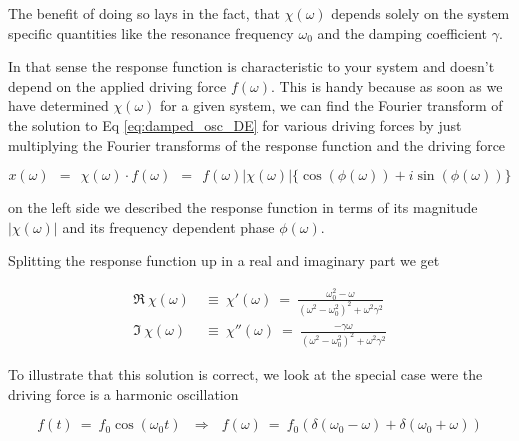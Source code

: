 \documentclass[10pt]{report}
\numberwithin{equation}{chapter}
\newcommand{\refEq}[1]{
  Eq  \ref{#1}
}
\begin{document}
The benefit of doing so lays in the fact, that $\chi(\omega)$ depends solely on the system specific 	quantities like the resonance frequency $\omega_0$ and the damping coefficient $\gamma$.

In that sense the response function is characteristic to your system and doesn't depend on the applied driving force $f(\omega)$. This is handy because as soon as we have determined $\chi(\omega)$ for a given system, we can find the Fourier transform of the solution to \refEq{eq:damped_osc_DE} for various driving forces by just multiplying the Fourier transforms of the response function and the driving force 

\begin{equation}
  x(\omega) ~~=~~ \chi(\omega) \cdot f(\omega) 
  ~~=~~ f(\omega) |\chi(\omega)| \{\cos(\phi(\omega)) +i \sin(\phi(\omega))\}
\end{equation}

on the left side we described the response function in terms of its magnitude $|\chi(\omega)|$ and its frequency dependent phase $\phi(\omega)$.



Splitting the response function up in a real and imaginary part we get

\begin{align}
  \Re\ \chi(\omega) ~& \equiv~ \chi'(\omega) ~=~ \frac{\omega^2_0 - \omega}{(\omega^2-\omega^2_0)^2 + \omega^2 \gamma^2} \\
  \Im\ \chi(\omega) ~& \equiv~ \chi''(\omega) ~=~ \frac{-\gamma \omega}{(\omega^2 - \omega^2_0)^2 + \omega^2 \gamma^2}
\end{align}



To illustrate that this solution is correct, we look at the special case were the driving force is a harmonic oscillation

\begin{equation}
  f(t) ~=~ f_0 \cos(\omega_0 t) ~~~\Rightarrow~~~ f(\omega) 
  ~=~ f_0 \left( \delta(\omega_0 - \omega) + \delta(\omega_0 + \omega) \right)
\end{equation}
\end{document}
